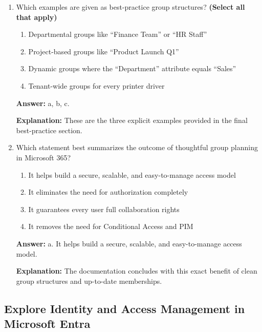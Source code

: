 \documentclass[10pt]{article}
\begin{document}
\begin{enumerate}[leftmargin=*]
\textbf{Explanation:} The best-practice section explicitly recommends aligning group membership with business roles, departments, or projects.

\item Which examples are given as best-practice group structures? \textbf{(Select all that apply)}
\begin{enumerate}[label=\alph*., leftmargin=1.5em]
\item Departmental groups like ``Finance Team'' or ``HR Staff''
\item Project-based groups like ``Product Launch Q1''
\item Dynamic groups where the ``Department'' attribute equals ``Sales''
\item Tenant-wide groups for every printer driver
\end{enumerate}
\textbf{Answer:} a, b, c.

\textbf{Explanation:} These are the three explicit examples provided in the final best-practice section.

\item Which statement best summarizes the outcome of thoughtful group planning in Microsoft 365?
\begin{enumerate}[label=\alph*., leftmargin=1.5em]
\item It helps build a secure, scalable, and easy-to-manage access model
\item It eliminates the need for authorization completely
\item It guarantees every user full collaboration rights
\item It removes the need for Conditional Access and PIM
\end{enumerate}
\textbf{Answer:} a. It helps build a secure, scalable, and easy-to-manage access model.

\textbf{Explanation:} The documentation concludes with this exact benefit of clean group structures and up-to-date memberships.

\end{enumerate}
\clearpage

\subsection{Explore Identity and Access Management in Microsoft Entra}
\end{document}
